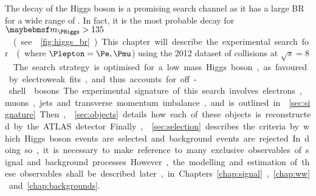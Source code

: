 
The \WW decay of the Higgs boson is a promising search channel as it has a large \ac{BR} 
for a wide range of \mH. In fact, it is the most probable decay for 
\unit{$\mH > 135$}{\GeV} (see \Figure~\ref{fig:higgs_br}). This chapter will describe the 
experimental search for \ggHWWlvlv (where $\Plepton = \Pe, \Pmu$) using the 2012 dataset 
of \pp collisions at \unit{$\sqrt{s} = 8$}{\TeV}. The search strategy is optimised for a 
low mass Higgs boson, as favoured by electroweak fits, and thus accounts for off-shell \PW 
bosons.

The experimental signature of this search involves electrons, muons, jets and transverse 
momentum imbalance, and is 
outlined in \Section~\ref{sec:signature}. Then, \Section~\ref{sec:objects} details how 
each of these objects is reconstructed by the ATLAS detector. Finally, 
\Section~\ref{sec:selection} describes the criteria by which Higgs boson events are 
selected and background events are rejected. In doing so, it is necessary to make 
reference to many exclusive observables of signal and background processes. However, 
the modelling and estimation of these observables shall be described later, in 
Chapters~\ref{chap:signal}, \ref{chap:ww} and \ref{chap:backgrounds}.
